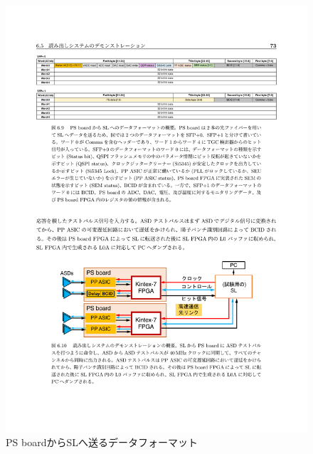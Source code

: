     \begin{figure} 
    \centering
    \includegraphics[width=16cm]{fig/Intro/TGC_PSBuplink.pdf}
    \caption[PS boardからSLへ送るデータフォーマット]{PS boardからSLへ送るデータフォーマット\cite{mt_aoki}}
    \label{TGC_PSBuplink}
    \end{figure}

